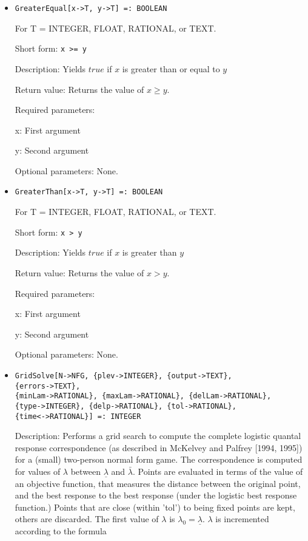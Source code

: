 \begin{itemize}
\item
\protect \large \begin{verbatim}
GreaterEqual[x->T, y->T] =: BOOLEAN
\end{verbatim}\normalsize

For T = INTEGER, FLOAT, RATIONAL, or TEXT.

\bd
\item
[Short form:] \verb+x >= y+
\item
[Description:] Yields $true$ if $x$ is greater than or equal to $y$
\item
[Return value:] Returns the value of $x \geq y$.
\item
[Required parameters:]\hfil\null

\bd
\item
[x:] First argument
\item
[y:] Second argument
\ed

\item
[Optional parameters:] None.
\ed

\item
\protect \large \begin{verbatim}
GreaterThan[x->T, y->T] =: BOOLEAN
\end{verbatim}\normalsize

For T = INTEGER, FLOAT, RATIONAL, or TEXT.

\bd
\item
[Short form:] \verb+x > y+
\item
[Description:] Yields $true$ if $x$ is greater than $y$
\item
[Return value:] Returns the value of $x > y$.
\item
[Required parameters:]\hfil\null

\bd
\item
[x:] First argument
\item
[y:] Second argument
\ed
\item
[Optional parameters:] None.
\ed

\item
\protect \large \begin{verbatim}
GridSolve[N->NFG, {plev->INTEGER}, {output->TEXT},
{errors->TEXT},
{minLam->RATIONAL}, {maxLam->RATIONAL}, {delLam->RATIONAL},
{type->INTEGER}, {delp->RATIONAL}, {tol->RATIONAL},
{time<->RATIONAL}] =: INTEGER
\end{verbatim}\normalsize

\bd
\item
[Description:] Performs a grid search to compute the complete logistic
quantal response correspondence (as described in McKelvey and Palfrey
[1994, 1995]) for a (small) two-person normal form game.  The
correspondence is computed for values of $\lambda$ between
$\underline{\lambda}$ and $\bar{\lambda}.$ Points are evaluated in
terms of the value of an objective function, that measures the
distance between the original point, and the best response to the best
response (under the logistic best response function.)  Points that are
close (within 'tol') to being fixed points are kept, others are
discarded.  The first value of $\lambda$ is $\lambda_0 =
\underline\lambda.$ $\lambda$ is incremented according to the formula


\end{itemize}
